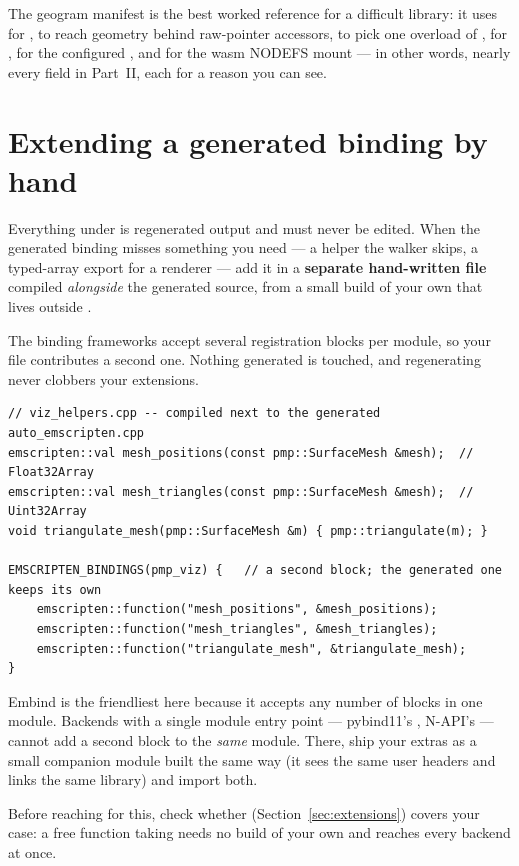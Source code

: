 The geogram manifest is the best worked reference for a difficult library: it
uses  for ,  to reach
geometry behind raw-pointer accessors,  to pick one overload of
,  for ,
 for the configured , and
 for the wasm NODEFS mount --- in other words, nearly every
field in Part~II, each for a reason you can see.

\section{Extending a generated binding by hand}

Everything under  is regenerated output and must never be
edited. When the generated binding misses something you need --- a helper the
walker skips, a typed-array export for a renderer --- add it in a
\textbf{separate hand-written file} compiled \emph{alongside} the generated
source, from a small build of your own that lives outside .

The binding frameworks accept several registration blocks per module, so your
file contributes a second one. Nothing generated is touched, and regenerating
never clobbers your extensions.

\begin{lstlisting}[style=cpp]
// viz_helpers.cpp -- compiled next to the generated auto_emscripten.cpp
emscripten::val mesh_positions(const pmp::SurfaceMesh &mesh);  // Float32Array
emscripten::val mesh_triangles(const pmp::SurfaceMesh &mesh);  // Uint32Array
void triangulate_mesh(pmp::SurfaceMesh &m) { pmp::triangulate(m); }

EMSCRIPTEN_BINDINGS(pmp_viz) {   // a second block; the generated one keeps its own
    emscripten::function("mesh_positions", &mesh_positions);
    emscripten::function("mesh_triangles", &mesh_triangles);
    emscripten::function("triangulate_mesh", &triangulate_mesh);
}
\end{lstlisting}

\begin{warn}
Embind is the friendliest here because it accepts any number of
 blocks in one module. Backends with a single module
entry point --- pybind11's , N-API's
 --- cannot add a second block to the \emph{same}
module. There, ship your extras as a small companion module built the same way
(it sees the same user headers and links the same library) and import both.
\end{warn}

Before reaching for this, check whether 
(Section~\ref{sec:extensions}) covers your case: a free function taking
 needs no build of your own and reaches every backend at once.
